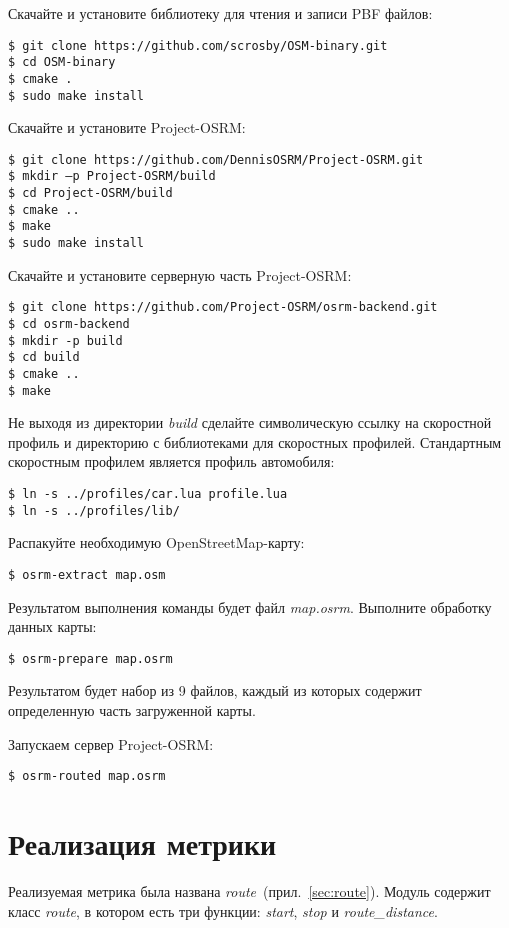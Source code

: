 Скачайте и установите библиотеку для чтения и записи PBF файлов:
\begin{lstlisting}
$ git clone https://github.com/scrosby/OSM-binary.git
$ cd OSM-binary
$ cmake .
$ sudo make install
\end{lstlisting}

Скачайте и установите Project-OSRM:
\begin{lstlisting}
$ git clone https://github.com/DennisOSRM/Project-OSRM.git
$ mkdir –p Project-OSRM/build
$ cd Project-OSRM/build
$ cmake ..
$ make
$ sudo make install
\end{lstlisting}

Скачайте и установите серверную часть Project-OSRM:
\begin{lstlisting}
$ git clone https://github.com/Project-OSRM/osrm-backend.git
$ cd osrm-backend
$ mkdir -p build
$ cd build
$ cmake ..
$ make
\end{lstlisting}

Не выходя из директории \emph{build} сделайте символическую ссылку на скоростной профиль и
директорию с библиотеками для скоростных профилей. Стандартным скоростным профилем является
профиль автомобиля:
\begin{lstlisting}
$ ln -s ../profiles/car.lua profile.lua
$ ln -s ../profiles/lib/
\end{lstlisting}

Распакуйте необходимую OpenStreetMap-карту:
\begin{lstlisting}
$ osrm-extract map.osm
\end{lstlisting}

Результатом выполнения команды будет файл \emph{map.osrm}. Выполните обработку данных карты:
\begin{lstlisting}
$ osrm-prepare map.osrm
\end{lstlisting}
Результатом будет набор из 9 файлов, каждый из которых содержит определенную часть загруженной
карты.

Запускаем сервер Project-OSRM:
\begin{lstlisting}
$ osrm-routed map.osrm
\end{lstlisting}

\section{Реализация метрики}
Реализуемая метрика была названа \emph{route}~(прил.~\ref{sec:route}). Модуль содержит класс
\emph{route}, в котором есть три функции: \emph{start}, \emph{stop} и \emph{route\_distance}.

